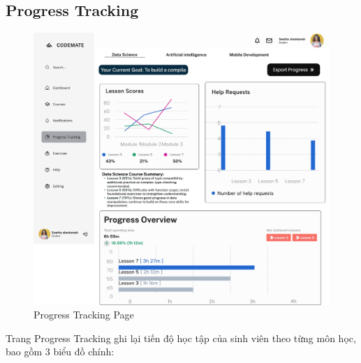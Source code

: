 \subsection{Progress Tracking}
\begin{figure}[H]
    \centering
    \includegraphics[width=1\linewidth]{Images/figmaDesign/Progress Tracking.png}
    \caption{Progress Tracking Page}
    \label{fig:enter-label}
\end{figure}
Trang Progress Tracking ghi lại tiến độ học tập của sinh viên theo từng môn học, bao gồm 3 biểu đồ chính: 
